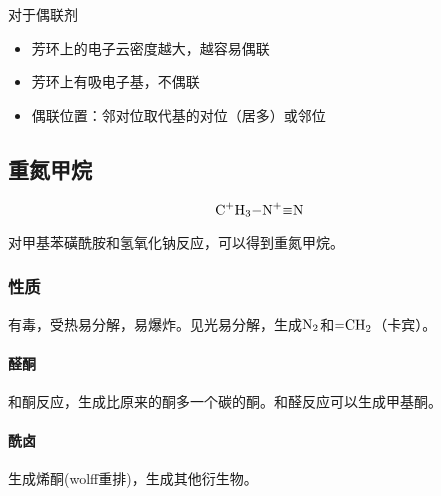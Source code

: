对于偶联剂
\begin{itemize}
  \item 芳环上的电子云密度越大，越容易偶联
  \item 芳环上有吸电子基，不偶联
  \item 偶联位置：邻对位取代基的对位（居多）或邻位
\end{itemize}


\subsection{重氮甲烷}

\begin{equation*}
  \ce{C^+H3-N^+#N}
\end{equation*}


对甲基苯磺酰胺和氢氧化钠反应，可以得到重氮甲烷。

\subsubsection{性质}

有毒，受热易分解，易爆炸。见光易分解，生成$\ce{N2}$和$\ce{=CH2}$（卡宾）。

\paragraph{醛酮} 和酮反应，生成比原来的酮多一个碳的酮。和醛反应可以生成甲基酮。

\paragraph{酰卤} 生成烯酮(wolff重排)，生成其他衍生物。


